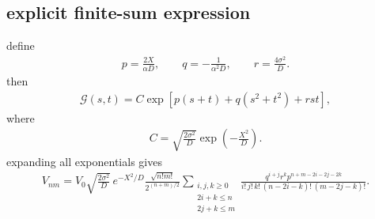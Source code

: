 \subsection{explicit finite-sum expression}
define
\begin{align}
    p=\frac{2X}{\alpha D},
    \qquad
    q=-\frac{1}{\alpha^2 D},
    \qquad
    r=\frac{4\sigma^2}{D}.
\end{align}
then
\begin{align}
    \mathcal G(s,t)
    =
    C\exp\left[p(s+t)+q(s^2+t^2)+rst\right],
\end{align}
where
\begin{align}
    C=
    \sqrt{\frac{2\sigma^2}{D}}
    \exp\left(-\frac{X^2}{D}\right).
\end{align}
expanding all exponentials gives
\begin{align}
    \boxed{
        V_{nm}
        =  V_0      \sqrt{\frac{2\sigma^2}{D}}\,
        e^{-X^2/D}
        \frac{\sqrt{n!m!}}{2^{(n+m)/2}}
    \sum_{\substack{i,j,k\ge0 \\2i+k\le n\\2j+k\le m}}
        \frac{
            q^{i+j}r^k
            p^{n+m-2i-2j-2k}
        }{
            i!\,j!\,k!\,
            (n-2i-k)!\,
            (m-2j-k)!
        }.
    }
\end{align}


